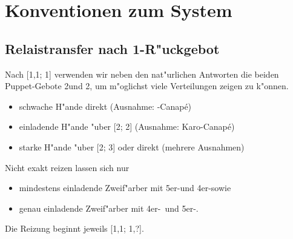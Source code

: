 \section{Konventionen zum System}

%
%
\subsection{Relaistransfer nach 1\SA-R"uckgebot} \label{1sarebid}

Nach [1\anybid{}\sep1\of; 1\SA{}] verwenden wir neben den nat"urlichen Antworten
die beiden Puppet-Gebote 2\tre und 2\SA, um m"oglichst viele Verteilungen zeigen
zu k"onnen.

\begin{itemize}
\item schwache H"ande direkt (Ausnahme: \ufa-Canap\'e)
\item einladende H"ande "uber [2\tre; 2\kar{}] (Ausnahme:
  Karo-Canap\'e)
\item starke H"ande "uber [2\SA; 3\tre{}] oder direkt (mehrere Ausnahmen)
\end{itemize}

Nicht exakt reizen lassen sich nur
\begin{itemize}
\item mindestens einladende Zweif"arber mit 5er-\ofa und 4er-\ufa sowie
\item genau einladende Zweif"arber mit 4er-\ofa\ und 5er-\tr.
\end{itemize}

Die Reizung beginnt jeweils [1\anybid{}\sep1\of; 1\SA{}\sep?].

